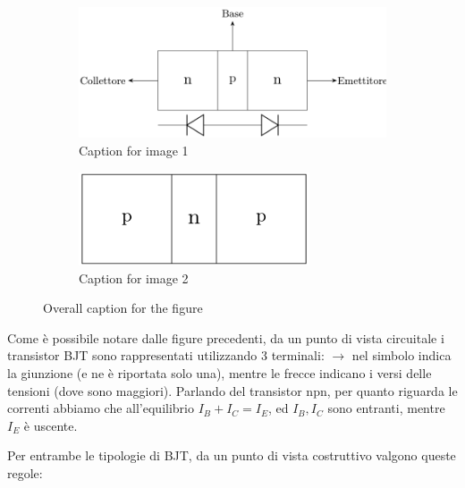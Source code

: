\documentclass[
]{book}
\begin{document}
\begin{figure}[H]
    \centering
    \begin{subfigure}[b]{0.45\textwidth}
        \centering
        \includegraphics[width=\textwidth]{immagini/npn.png}
        \caption{Caption for image 1}
        \label{fig:image1}
    \end{subfigure}
    \hfill
    \begin{subfigure}[b]{0.45\textwidth}
        \centering
        \includegraphics[width=0.75\textwidth]{immagini/pnp.png}
        \caption{Caption for image 2}
        \label{fig:image2}
    \end{subfigure}
    \caption{Overall caption for the figure}
    \label{fig:subfigures}
\end{figure}

Come è possibile notare dalle figure precedenti, da un punto di vista
circuitale i transistor BJT sono rappresentati utilizzando 3 terminali:
\(\to\) nel simbolo indica la giunzione (e ne è riportata solo una),
mentre le frecce indicano i versi delle tensioni (dove sono maggiori).
Parlando del transistor npn, per quanto riguarda le correnti abbiamo che
all'equilibrio \(I_B + I_C = I_E\), ed \(I_B, I_C\) sono entranti,
mentre \(I_E\) è uscente.

Per entrambe le tipologie di BJT, da un punto di vista costruttivo
valgono queste regole:
\end{document}
